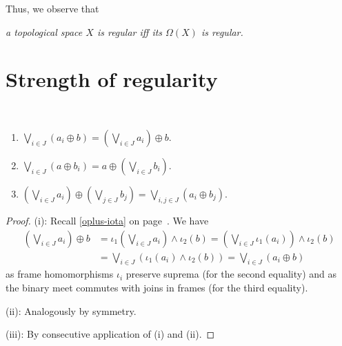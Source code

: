 Thus, we observe that
\begin{center} 
  \emph{a topological space $X$ is regular iff its $\Omega(X)$ is regular.\/}
\end{center}

\section{Strength of regularity}

\begin{lem} \label{oplus-vee-distrib}
  ~
  \begin{enumerate}
  \item $\bigvee_{i\in J} \left(a_i \oplus b\right) = \left(\bigvee_{i\in J}
    a_i \right) \oplus b$.
  \item $\bigvee_{i\in J} \left(a \oplus b_i\right) = a \oplus
    \left(\bigvee_{i\in J} b_i \right)$.
  \item $\left(\bigvee_{i\in J} a_i\right) \oplus \left(\bigvee_{j\in J}
    b_j\right) = \bigvee_{i, j\in J} \left(a_i \oplus b_j\right)$.
  \end{enumerate}
\end{lem}
\begin{proof}
  (i):
  Recall \ref{oplus-iota} on page~\pageref{oplus-iota}\thinspace.
  We have
  \begin{align*}
    \left(\bigvee_{i\in J} a_i \right) \oplus b
    &= \iota_1\left(\bigvee_{i\in J} a_i \right) \wedge \iota_2(b)
    = \left(\bigvee_{i\in J} \iota_1(a_i) \right) \wedge \iota_2(b) \\
    &= \bigvee_{i\in J} \left(\iota_1(a_i) \wedge \iota_2(b) \right)
    = \bigvee_{i\in J} \left(a_i \oplus b\right)
  \end{align*}
  as frame homomorphisms $\iota_i$ preserve suprema (for the second equality)
  and as the binary meet commutes with joins in frames (for the third
  equality).

  (ii):
  Analogously by symmetry.

  (iii):
  By consecutive application of (i) and (ii).
\end{proof}

